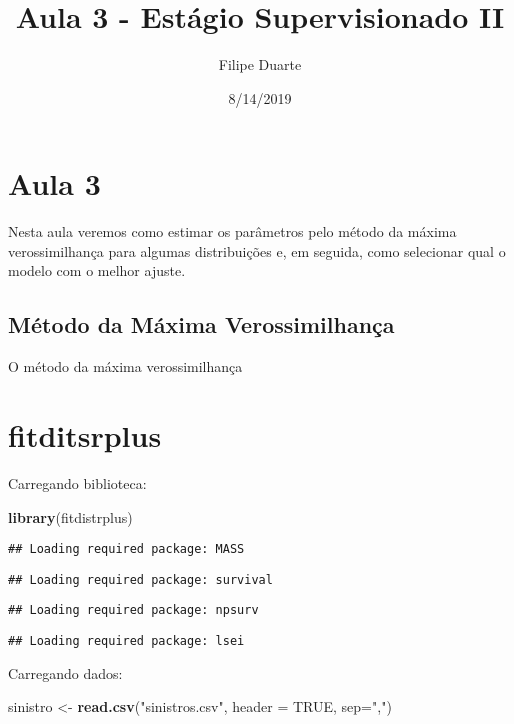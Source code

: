 \documentclass[]{article}
\title{Aula 3 - Estágio Supervisionado II}
\author{Filipe Duarte}
\date{8/14/2019}
\newenvironment{Shaded}{\begin{snugshade}}{\end{snugshade}}
\newcommand{\DataTypeTok}[1]{\textcolor[rgb]{0.13,0.29,0.53}{#1}}
\newcommand{\KeywordTok}[1]{\textcolor[rgb]{0.13,0.29,0.53}{\textbf{#1}}}
\newcommand{\NormalTok}[1]{#1}
\newcommand{\OtherTok}[1]{\textcolor[rgb]{0.56,0.35,0.01}{#1}}
\newcommand{\StringTok}[1]{\textcolor[rgb]{0.31,0.60,0.02}{#1}}
\begin{document}
\maketitle

\hypertarget{aula-3}{%
\section{Aula 3}\label{aula-3}}

Nesta aula veremos como estimar os parâmetros pelo método da máxima
verossimilhança para algumas distribuições e, em seguida, como
selecionar qual o modelo com o melhor ajuste.

\hypertarget{metodo-da-maxima-verossimilhanca}{%
\subsection{Método da Máxima
Verossimilhança}\label{metodo-da-maxima-verossimilhanca}}

O método da máxima verossimilhança

\hypertarget{fitditsrplus}{%
\section{fitditsrplus}\label{fitditsrplus}}

Carregando biblioteca:

\begin{Shaded}
\begin{Highlighting}[]
\KeywordTok{library}\NormalTok{(fitdistrplus)}
\end{Highlighting}
\end{Shaded}

\begin{verbatim}
## Loading required package: MASS
\end{verbatim}

\begin{verbatim}
## Loading required package: survival
\end{verbatim}

\begin{verbatim}
## Loading required package: npsurv
\end{verbatim}

\begin{verbatim}
## Loading required package: lsei
\end{verbatim}

Carregando dados:

\begin{Shaded}
\begin{Highlighting}[]
\NormalTok{sinistro <-}\StringTok{ }\KeywordTok{read.csv}\NormalTok{(}\StringTok{"sinistros.csv"}\NormalTok{, }\DataTypeTok{header =} \OtherTok{TRUE}\NormalTok{, }\DataTypeTok{sep=}\StringTok{","}\NormalTok{)}
\end{Highlighting}
\end{Shaded}
\end{document}
